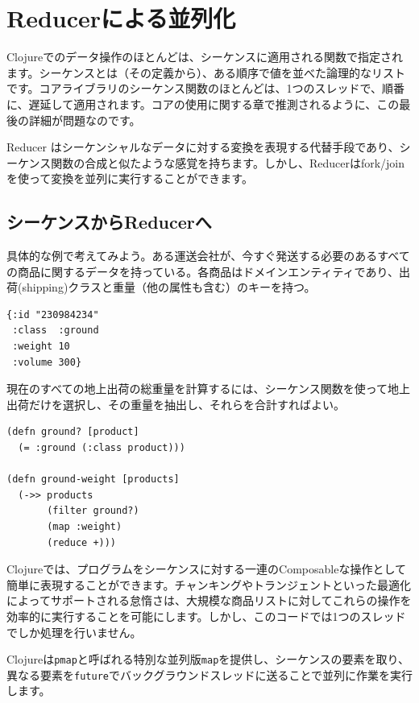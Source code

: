 \section{Reducerによる並列化}

Clojureでのデータ操作のほとんどは、シーケンスに適用される関数で指定されます。シーケンスとは（その定義から）、ある順序で値を並べた論理的なリストです。コアライブラリのシーケンス関数のほとんどは、1つのスレッドで、順番に、遅延して適用されます。コアの使用に関する章で推測されるように、この最後の詳細が問題なのです。

Reducer はシーケンシャルなデータに対する変換を表現する代替手段であり、シーケンス関数の合成と似たような感覚を持ちます。しかし、Reducerはfork/joinを使って変換を並列に実行することができます。

\subsection{シーケンスからReducerへ}

具体的な例で考えてみよう。ある運送会社が、今すぐ発送する必要のあるすべての商品に関するデータを持っている。各商品はドメインエンティティであり、出荷(shipping)クラスと重量（他の属性も含む）のキーを持つ。


\begin{lstlisting}[numbers=none]
{:id "230984234"
 :class  :ground
 :weight 10
 :volume 300}
\end{lstlisting}

現在のすべての地上出荷の総重量を計算するには、シーケンス関数を使って地上出荷だけを選択し、その重量を抽出し、それらを合計すればよい。


\begin{lstlisting}[numbers=none]
(defn ground? [product]
  (= :ground (:class product)))

(defn ground-weight [products]
  (->> products
       (filter ground?)
       (map :weight)
       (reduce +)))
\end{lstlisting}

Clojureでは、プログラムをシーケンスに対する一連のComposableな操作として簡単に表現することができます。チャンキングやトランジェントといった最適化によってサポートされる怠惰さは、大規模な商品リストに対してこれらの操作を効率的に実行することを可能にします。しかし、このコードでは1つのスレッドでしか処理を行いません。

Clojureは\texttt{pmap}と呼ばれる特別な並列版\texttt{map}を提供し、シーケンスの要素を取り、異なる要素を\texttt{future}でバックグラウンドスレッドに送ることで並列に作業を実行します。

